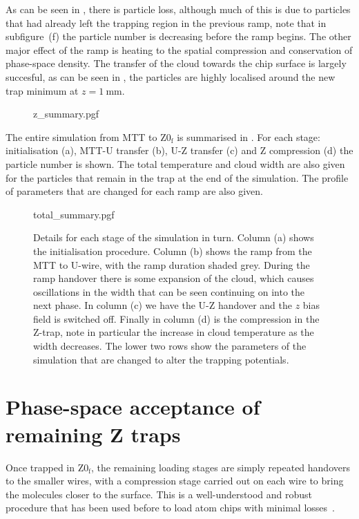 As can be seen in , there is particle loss,
although much of this is due to particles that had already left the trapping
region in the previous ramp, note that in subfigure~(f) the particle number is
decreasing before the ramp begins. The other major effect of the ramp is
heating to the spatial compression and conservation of phase-space density.
%
The transfer of the cloud towards the chip surface is largely succesful, as can
be seen in , the particles are highly localised
around the new trap minimum at $z=\SI{1}{\milli\meter}$.

\begin{figure}[p]
\centering
  {z_summary.pgf}
  \caption{
  }
  \label{design:fig:zsim}
\end{figure}

The entire simulation from MTT to $\mathrm{Z0_f}$ is summarised in
. For each stage: initialisation (a), MTT-U
transfer (b), U-Z transfer (c) and Z compression (d) the particle number is
shown. The total temperature and cloud width are also given for the particles
that remain in the trap at the end of the simulation. The profile of parameters
that are changed for each ramp are also given.

\begin{figure}[p]
\centering
  {total_summary.pgf}
  \caption{
    Details for each stage of the simulation in turn. Column (a) shows the
    initialisation procedure. Column (b) shows the ramp from the MTT to U-wire,
    with the ramp duration shaded grey. During the ramp handover there is some
    expansion of the cloud, which causes oscillations in the width that can be
    seen continuing on into the next phase. In column (c) we have the U-Z
    handover and the $z$ bias field is switched off. Finally in column (d) is the
    compression in the Z-trap, note in particular the increase in cloud
    temperature as the width decreases. The lower two rows show the parameters
    of the simulation that are changed to alter the trapping potentials.
  }
  \label{design:fig:simsum}
\end{figure}


\section{Phase-space acceptance of remaining Z traps}
\label{design:transferbetweenzs}

Once trapped in $\mathrm{Z0_f}$, the remaining loading stages are simply
repeated handovers to the smaller wires, with a compression stage carried out
on each wire to bring the molecules closer to the surface. This is a
well-understood and robust procedure that has been used before to load atom
chips with minimal losses~\cite{Reichel2002}.

